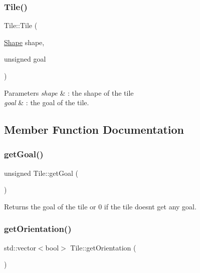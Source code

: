 \subsubsection{\texorpdfstring{Tile()}{Tile()}\hspace{0.1cm}{\footnotesize\ttfamily [2/2]}}
{\footnotesize\ttfamily Tile\+::\+Tile (\begin{DoxyParamCaption}\item[{\mbox{\hyperlink{Shape_8h_a55b506070847a13554f8b879c1bfb37c}{Shape}}}]{shape,  }\item[{unsigned}]{goal }\end{DoxyParamCaption})}


\begin{DoxyParams}{Parameters}
{\em shape} & \+: the shape of the tile \\
\hline
{\em goal} & \+: the goal of the tile. \\
\hline
\end{DoxyParams}


\subsection{Member Function Documentation}
\mbox{\label{classTile_a9b4860cd460b41be96acef3015ce5a08}} 
\subsubsection{\texorpdfstring{getGoal()}{getGoal()}}
{\footnotesize\ttfamily unsigned Tile\+::get\+Goal (\begin{DoxyParamCaption}{ }\end{DoxyParamCaption})}

\begin{DoxyReturn}{Returns}
the goal of the tile or 0 if the tile doesn\textquotesingle{}t get any goal. 
\end{DoxyReturn}
\mbox{\label{classTile_a60a2686c593dfc0ccceef28395eaa566}} 
\subsubsection{\texorpdfstring{getOrientation()}{getOrientation()}}
{\footnotesize\ttfamily std\+::vector$<$bool$>$ Tile\+::get\+Orientation (\begin{DoxyParamCaption}{ }\end{DoxyParamCaption})}

